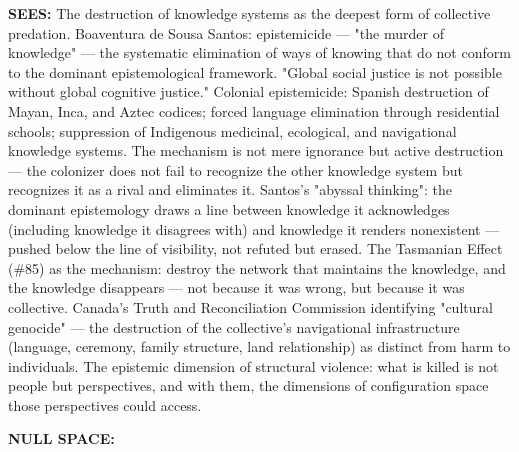 \textbf{SEES:} The destruction of knowledge systems as the deepest form of collective predation. Boaventura de Sousa Santos: epistemicide — "the murder of knowledge" — the systematic elimination of ways of knowing that do not conform to the dominant epistemological framework. "Global social justice is not possible without global cognitive justice." Colonial epistemicide: Spanish destruction of Mayan, Inca, and Aztec codices; forced language elimination through residential schools; suppression of Indigenous medicinal, ecological, and navigational knowledge systems. The mechanism is not mere ignorance but active destruction — the colonizer does not fail to recognize the other knowledge system but recognizes it as a rival and eliminates it. Santos's "abyssal thinking": the dominant epistemology draws a line between knowledge it acknowledges (including knowledge it disagrees with) and knowledge it renders nonexistent — pushed below the line of visibility, not refuted but erased. The Tasmanian Effect (\#85) as the mechanism: destroy the network that maintains the knowledge, and the knowledge disappears — not because it was wrong, but because it was collective. Canada's Truth and Reconciliation Commission identifying "cultural genocide" — the destruction of the collective's navigational infrastructure (language, ceremony, family structure, land relationship) as distinct from harm to individuals. The epistemic dimension of structural violence: what is killed is not people but perspectives, and with them, the dimensions of configuration space those perspectives could access.


\textbf{NULL SPACE:}

